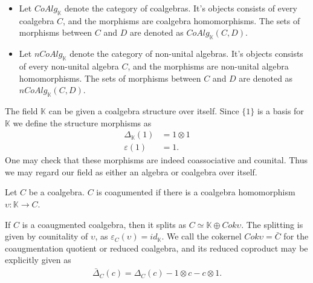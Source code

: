 \documentclass[../thesis.tex]{subfiles}
\begin{document}
            \begin{definition}
                \begin{itemize}
                    \item Let $CoAlg_{\mathbb{K}}$ denote the category of coalgebras. It's objects consists of every coalgebra $C$, and the morphisms are coalgebra homomorphisms. The sets of morphisms between $C$ and $D$ are denoted as $CoAlg_{\mathbb{K}}(C,D)$.
                    \item Let $nCoAlg_{\mathbb{K}}$ denote the category of non-unital algebras. It's objects consists of every non-unital algebra $C$, and the morphisms are non-unital algebra homomorphisms. The sets of morphisms between $C$ and $D$ are denoted as $nCoAlg_{\mathbb{K}}(C,D)$.
                \end{itemize}
            \end{definition}

            \begin{example}
                The field $\mathbb{K}$ can be given a coalgebra structure over itself. Since $\{1\}$ is a basis for $\mathbb{K}$ we define the structure morphisms as
                \begin{align*}
                    \Delta_{\mathbb{K}}(1) & = 1\otimes 1 \\
                    \varepsilon(1) & = 1.
                \end{align*}
                One may check that these morphisms are indeed coassociative and counital. Thus we may regard our field as either an algebra or coalgebra over itself.
            \end{example}

            \begin{definition}
                Let $C$ be a coalgebra. $C$ is coagumented if there is a coalgebra homomorphism $\upsilon:\mathbb{K}\rightarrow C$.
            \end{definition}

            If $C$ is a coaugmented coalgebra, then it splits as $C\simeq \mathbb{K}\oplus Cok\upsilon$. The splitting is given by counitality of $\upsilon$, as $\varepsilon_C(\upsilon) = id_{\mathbb{K}}$. We call the cokernel $Cok\upsilon = \bar{C}$ for the coaugmentation quotient or reduced coalgebra, and its reduced coproduct may be explicitly given as
            \begin{align*}
                \bar{\Delta}_C(c) = \Delta_C(c) - 1\otimes c - c\otimes 1. 
            \end{align*}
\end{document}

